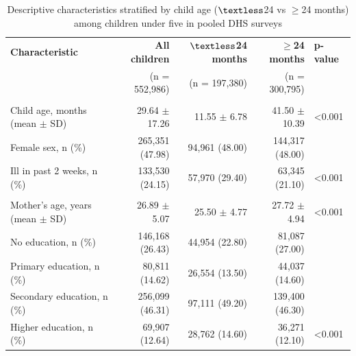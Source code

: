 \begin{table}[ht]
\centering
\caption{Descriptive characteristics stratified by child age ($\textless$24 vs $\geq$24 months) among children under five in pooled DHS surveys}

\label{tab:age_stratified}
\begin{threeparttable}

\small
\renewcommand{\arraystretch}{1.15}
\setlength{\tabcolsep}{4pt}

\begin{tabularx}{\textwidth}{
@{}>{\raggedright\arraybackslash}X 
r 
r 
r 
>{\raggedleft\arraybackslash}p{1.2cm}@{}}
\toprule
\textbf{Characteristic} &
\textbf{All children} &
\textbf{$\textless$24 months} &
\textbf{$\geq$24 months} &
\textbf{p-value} \\
& (n = 552{,}986) & (n = 197{,}380) & (n = 300{,}795) & \\
\midrule

\multicolumn{5}{l}{\textbf{Child characteristics}} \\

Child age, months (mean $\pm$ SD)
& 29.64 $\pm$ 17.26
& 11.55 $\pm$ 6.78
& 41.50 $\pm$ 10.39
& \textless0.001 \\

Female sex, n (\%)
& 265{,}351 (47.98)
& 94{,}961 (48.00)
& 144{,}317 (48.00)
& 0.519 \\

Ill in past 2 weeks, n (\%)
& 133{,}530 (24.15)
& 57{,}970 (29.40)
& 63{,}345 (21.10)
& \textless0.001 \\

\addlinespace[4pt]
\multicolumn{5}{l}{\textbf{Maternal characteristics}} \\

Mother's age, years (mean $\pm$ SD)
& 26.89 $\pm$ 5.07
& 25.50 $\pm$ 4.77
& 27.72 $\pm$ 4.94
& \textless0.001 \\

No education, n (\%)
& 146{,}168 (26.43)
& 44{,}954 (22.80)
& 81{,}087 (27.00)
&  \\

Primary education, n (\%)
& 80{,}811 (14.62)
& 26{,}554 (13.50)
& 44{,}037 (14.60)
&  \\

Secondary education, n (\%)
& 256{,}099 (46.31)
& 97{,}111 (49.20)
& 139{,}400 (46.30)
&  \\

Higher education, n (\%)
& 69{,}907 (12.64)
& 28{,}762 (14.60)
& 36{,}271 (12.10)
& \textless0.001 \\


\end{tabularx}
\end{threeparttable}
\end{table}
